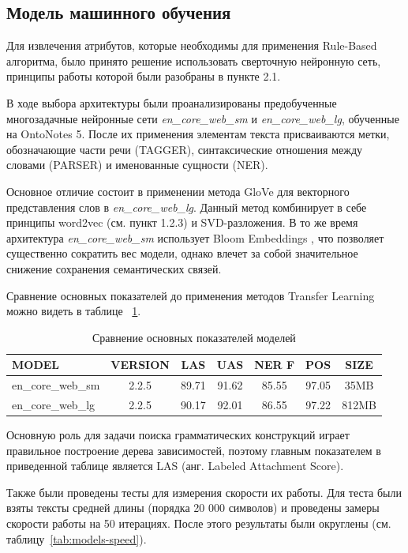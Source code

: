 \newpage
\subsection{Модель машинного обучения}
Для извлечения атрибутов, которые необходимы для применения Rule-Based алгоритма, было принято решение использовать сверточную нейронную сеть, принципы работы которой были разобраны в пункте 2.1.

В ходе выбора архитектуры были проанализированы предобученные многозадачные нейронные сети \emph{en\_core\_web\_sm} и  \emph{en\_core\_web\_lg}, обученные на OntoNotes 5. После их применения элементам текста присваиваются метки, обозначающие части речи (TAGGER), синтаксические отношения между словами (PARSER) и именованные сущности (NER).

Основное отличие состоит в применении метода GloVe \autocite{pennington2014glove} для векторного представления слов в \emph{en\_core\_web\_lg}. Данный метод комбинирует в себе принципы word2vec (см. пункт 1.2.3) и SVD-разложения. В то же время архитектура \emph{en\_core\_web\_sm} использует Bloom Embeddings \autocite{DBLP:journals/corr/SerraK17}, что позволяет существенно сократить вес модели, однако влечет за собой значительное снижение сохранения семантических связей. 

Сравнение основных показателей до применения методов Transfer Learning можно видеть в таблице ~\ref{tab:nlp-characteristics}.

\begin{table}
\centering
\caption{\label{tab:nlp-characteristics}Сравнение основных показателей моделей}
\begin{tabular}{@{}lcccccc@{}}
\toprule
MODEL             & VERSION & LAS   & UAS   & NER F & POS   & SIZE  \\ \midrule
en\_core\_web\_sm & 2.2.5   & 89.71 & 91.62 & 85.55 & 97.05 & 35MB  \\
en\_core\_web\_lg & 2.2.5   & 90.17 & 92.01 & 86.55 & 97.22 & 812MB \\ \bottomrule
\end{tabular}
\end{table}
Основную роль для задачи поиска грамматических конструкций играет правильное построение дерева зависимостей, поэтому главным показателем в приведенной таблице является LAS (анг. Labeled Attachment Score).

Также были проведены тесты для измерения скорости их работы. Для теста были взяты тексты средней длины (порядка 20 000 символов) и проведены замеры скорости работы на 50 итерациях. После этого результаты были округлены (см. таблицу~\ref{tab:models-speed}). 


